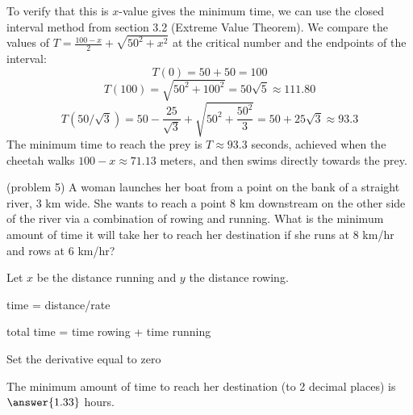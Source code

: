 \documentclass[handout]{ximera}
\begin{document}
\begin{example}[example 5]
To verify that this is $x$-value gives the minimum time, we can use the closed interval method from 
section 3.2 (Extreme Value Theorem).
We compare the values of $T = \frac{100-x}{2} + \sqrt{50^2 + x^2}$ at the critical number and the endpoints of the interval:
\[
T(0) = 50 +  50 = 100 
\]
\[
T(100) =  \sqrt{50^2 + 100^2} = 50\sqrt 5 \approx 111.80
\]
\[
T(50/\sqrt 3) = 50 - \frac{25}{\sqrt{3}} +  \sqrt{50^2 + \frac{50^2}{3}} = 50 + 25\sqrt{3} \approx 93.3
\]
The minimum time to reach the prey is  $T \approx 93.3$ seconds, achieved when the cheetah 
walks $100 -x \approx 71.13$ meters, and
then swims directly towards the prey.
\end{example}

\begin{problem}(problem 5)
A woman launches her boat from a point on the bank of a straight river, 3 km wide. 
She wants to reach a point 8 km downstream on the other side of the river via a combination of rowing and running.
What is the minimum amount of time it will take her to reach her destination if she runs at 8 km/hr and rows at 6 km/hr?


\begin{hint}
Let $x$ be the distance running and $y$ the distance rowing.
\end{hint}
\begin{hint}
time = distance/rate
\end{hint}
\begin{hint}
total time = time rowing + time running
\end{hint}
\begin{hint}
Set the derivative equal to zero
\end{hint}

The minimum amount of time to reach her destination (to 2 decimal places) is $\answer{1.33}$ hours.
\end{problem}
\end{document}
